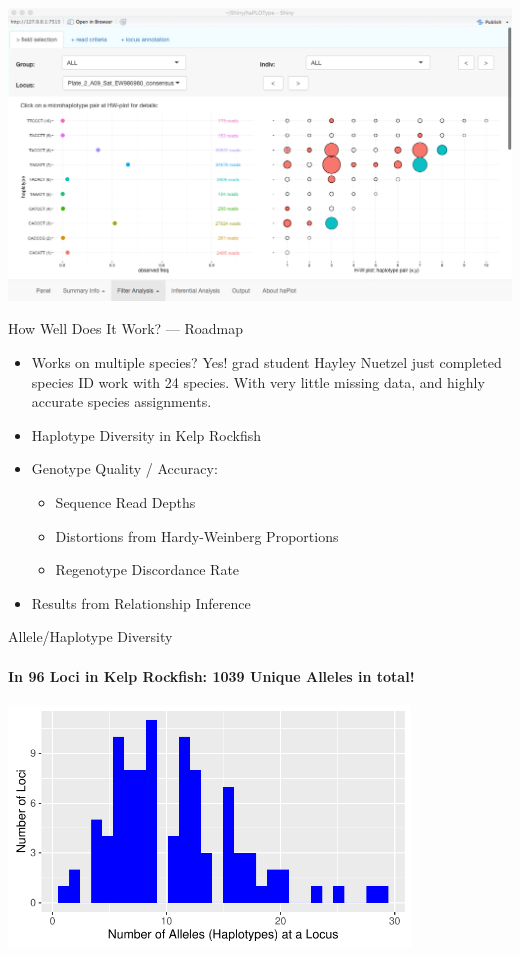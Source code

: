 \documentclass[letter,graphicx]{beamer}
\begin{document}
\newpage
\mbox{}
\vspace*{2em}
\mbox{}
\includegraphics[width=\textwidth]{figs/haplot2.png}



\begin{frame}{How Well Does It Work? --- Roadmap}

\begin{itemize}
\item Works on multiple species?  Yes! grad student Hayley Nuetzel just completed species ID work with 24 species.  With very little missing data, and highly accurate species assignments.
\item Haplotype Diversity in Kelp Rockfish
\item Genotype Quality / Accuracy:
\begin{itemize}
\item Sequence Read Depths
\item Distortions from Hardy-Weinberg Proportions
\item Regenotype Discordance Rate
\end{itemize}
\item Results from Relationship Inference
\end{itemize}
\end{frame}



\begin{frame}{Allele/Haplotype Diversity}
\framesubtitle{In 96 Loci in Kelp Rockfish: 1039 Unique Alleles in total!}
\begin{center}
\includegraphics[width = 0.8\textwidth]{figs/alle-count-histo.pdf}
\end{center}
\end{frame}
\end{document}
